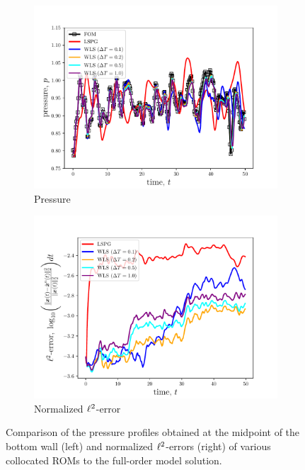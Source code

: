 \begin{figure}
\begin{center}

\begin{subfigure}[t]{0.495\textwidth}
\includegraphics[trim={0cm 00.0cm 0cm 0cm},clip,width=1.\linewidth]{figs/cavity_new/p_vs_t.pdf}
\caption{Pressure} 
\label{fig:cav_results1a}
\end{subfigure}
\begin{subfigure}[t]{0.495\textwidth}
\includegraphics[trim={0cm 0cm 0cm 0cm},clip,width=1.\linewidth]{figs/cavity_new/error_vs_t.pdf}
\caption{Normalized $\ell^2$-error}
\label{fig:cav_results1b}
\end{subfigure}

\end{center}
\caption{Comparison of the pressure profiles obtained at the midpoint of the bottom wall (left) and normalized $\ell^2$-errors (right) of various collocated ROMs to the full-order model solution.}
\label{fig:cav_results1}
\end{figure}

